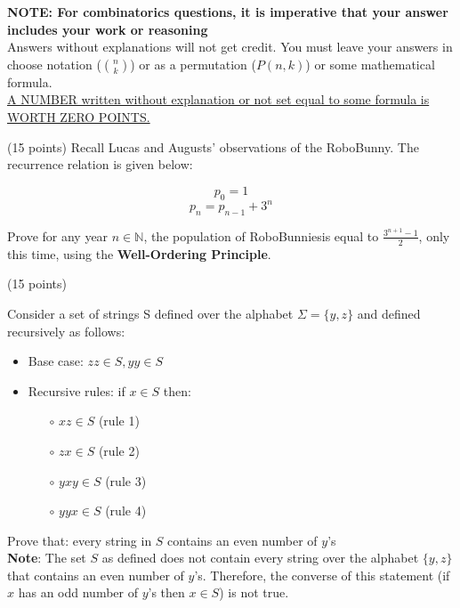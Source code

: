 \documentclass[11pt]{article}
\begin{document}

\textbf{NOTE: For combinatorics questions, it is imperative that your answer includes your work or reasoning}\\

Answers without explanations will not get credit. You must leave your answers in choose notation (${n \choose k}$) or as a permutation ($P(n, k)$) or some mathematical formula.\\

\underline{A NUMBER written without explanation or not set equal to some formula is WORTH ZERO POINTS.}

\begin{problem} (15 points)
Recall Lucas and Augusts' observations of the RoboBunny\texttrademark. The recurrence relation is given below:

$$p_0 = 1$$
$$p_n = p_{n-1} + 3^{n}$$ 

Prove for any year $n \in \mathbb{N}$, the population of RoboBunnies\texttrademark is equal to $\frac{3^{n+1}-1}{2}$, only this time, using the \textbf{Well-Ordering Principle}. 


\end{problem}

\bigskip

	\begin{problem} (15 points)
		
		Consider a set of strings S defined over the alphabet $\Sigma = \{y, z\}$ and defined recursively as follows:
		\begin{itemize}
			\item Base case: $zz \in S, yy \in S$
			\item Recursive rules: if $x \in S$ then:
			\begin{itemize}
				\item [$\circ$] $xz \in S$ (rule 1)
				\item [$\circ$] $zx \in S$ (rule 2)
				\item [$\circ$] $yxy \in S$ (rule 3)
				\item [$\circ$] $yyx \in S$ (rule 4)
			\end{itemize}
		\end{itemize}
		
		Prove that: every string in $S$ contains an even number of $y$'s\\
		
		\textbf{Note}:  The set $S$ as defined does not contain every string over the alphabet $\{y, z\}$ that contains an even number of $y$'s. Therefore, the converse of this statement (if $x$ has an odd number of $y$'s then $x \in S$) is not true.
		
		
		
		
		
	\end{problem}
\end{document}
